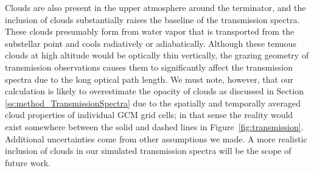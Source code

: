 \documentclass[11pt,numberedappendix,twocolappendix,]{emulateapj}
\newcommand{\dsa}[1]{{\color{blue}#1}}
\newcommand{\yf}[1]{{\color{orange}#1}}
\begin{document}
\yf{Clouds} are also present in the upper atmosphere around the terminator, and the inclusion of clouds substantially raises the baseline of the transmission spectra. 
%
These clouds presumably form from water vapor that is transported from the substellar point and cools radiatively or adiabatically. 
%
%
Although these tenuous clouds at high altitude would be optically thin vertically, the grazing geometry of transmission observations causes them to significantly affect the transmission spectra due to the long optical path length. 
We must note, however, that our calculation is likely to overestimate the opacity of clouds as discussed in Section \ref{ss:method_TransmissionSpectra} \yf{due to the spatially and temporally averaged cloud properties of individual GCM grid cells;} 
in that sense the reality would exist somewhere between the solid and dashed lines in Figure~\ref{fig:transmission}.
Additional uncertainties come from other assumptions we made. 
A more realistic inclusion of clouds in our simulated transmission spectra will be the scope of future work. 
\end{document}
